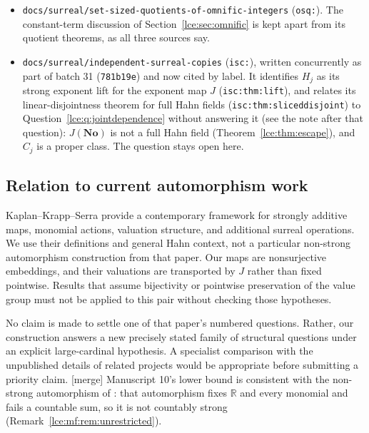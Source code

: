 \documentclass[11pt,letterpaper]{article}
\numberwithin{equation}{section}
\theoremstyle{definition}
\theoremstyle{remark}
\newcommand{\No}{\mathbf{No}}
\newcommand{\R}{\mathbb R}
\newcommand{\Sk}{\mathscr S_{<\kappa}}
\newcommand{\Common}{C_j}
\newcommand{\thref}[1]{Theorem~\ref{#1}}
\newcommand{\mergetag}{\textup{\textsf{\small[merge]}}}%
\newcommand{\lbl}[1]{\nolinkurl{#1}}%
\newcommand{\fn}[1]{\nolinkurl{#1}}%
\begin{document}
\begin{itemize}
Maximal transcendence over order-bounded supports there;
\thref{lce:sg:thm:maximal} is over cardinality-bounded supports. Neither
implies the other. \mergetag{} Batch 32: its Galois part asks
(\lbl{bst:gr:q:cardinal}) which of its constructions survive in fields of
Hahn series with fewer than $\kappa$ terms, at regular and singular
$\kappa$. \thref{lce:sg:thm:shortfield} supplies the ambient real closed
field $\Sk$ for every uncountable $\kappa$, singular included; the Galois
constructions are not treated here, and the question is not answered.
\item \fn{docs/surreal/set-sized-quotients-of-omnific-integers}
(\lbl{osq:}). The constant-term discussion of Section~\ref{lce:sec:omnific}
is kept apart from its quotient theorems, as all three sources say.
\item \fn{docs/surreal/independent-surreal-copies} (\lbl{isc:}), written
concurrently as part of batch 31 (\texttt{781b19e}) and now cited by
label. It identifies $H_j$ as its strong exponent lift for the exponent map $J$ (\lbl{isc:thm:lift}), and relates its
linear-disjointness theorem for full Hahn fields
(\lbl{isc:thm:sliceddisjoint}) to Question~\ref{lce:q:jointdependence}
without answering it (see the note after that question): $J(\No)$ is not
a full Hahn field
(\thref{lce:thm:escape}), and $\Common$ is a proper class. The question
stays open here.
\end{itemize}

\subsection{Relation to current automorphism work}
Kaplan--Krapp--Serra \cite{KKS} provide a contemporary framework for
strongly additive maps, monomial actions, valuation structure, and
additional surreal operations. We use their definitions and general Hahn
context, not a particular non-strong automorphism construction from that
paper. Our maps are nonsurjective embeddings, and their valuations are
transported by $J$ rather than fixed pointwise. Results that assume
bijectivity or pointwise preservation of the value group must not be
applied to this pair without checking those hypotheses.

No claim is made to settle one of that paper's numbered questions.
Rather, our construction answers a new precisely stated family of
structural questions under an explicit large-cardinal hypothesis. A
specialist comparison with the unpublished details of related projects
would be appropriate before submitting a priority claim.
\mergetag{} Manuscript 10's lower bound is consistent with the non-strong
automorphism of \cite[Example~4.4]{KKS}: that automorphism fixes $\R$ and
every monomial and fails a countable sum, so it is not countably strong
(Remark~\ref{lce:mf:rem:unrestricted}).
\end{document}
